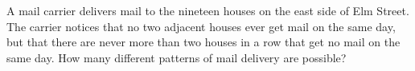 A mail carrier delivers mail to the nineteen houses on the east side of Elm Street.  The carrier notices that no two adjacent houses ever get mail on the same day, but that there are never more than two houses in a row that get no mail on the same day.  How many different patterns of mail delivery are possible?